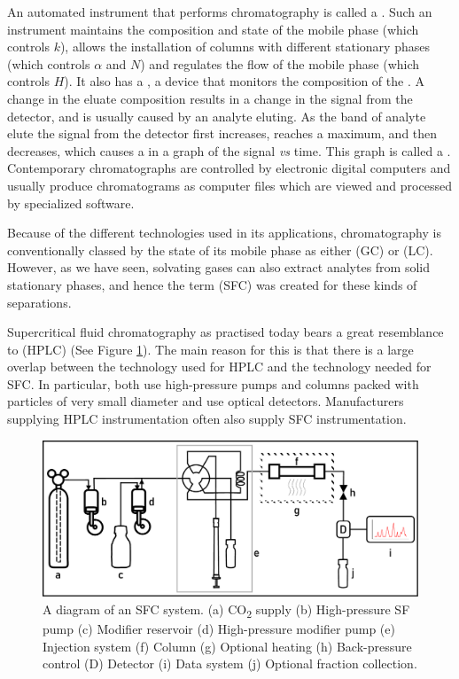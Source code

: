 An automated instrument that performs chromatography is called a
. Such an instrument maintains the composition and state
of the mobile phase (which controls \(k\)), allows the installation of columns
with different stationary phases (which controls \(\alpha\) and \(N\)) and
regulates the flow of the mobile phase (which controls \(H\)). It also has a
, a device that monitors the composition of the
. A change in the eluate composition results in a change in the
signal from the detector, and is usually caused by an analyte eluting. As the
band of analyte elute the signal from the detector first increases, reaches a
maximum, and then decreases, which causes a  in a graph of the
signal \textit{vs} time. This graph is called a .
Contemporary chromatographs are controlled by electronic digital computers and
usually produce chromatograms as computer files which are viewed and processed
by specialized software.

Because of the different technologies used in its applications, chromatography
is conventionally classed by the state of its mobile phase as either
 (GC) or  (LC).
However, as we have seen, solvating gases can also extract analytes from solid
stationary phases, and hence the term  (SFC) was created for these kinds of separations.

Supercritical fluid chromatography as practised today bears a great resemblance
to  (HPLC) (See Figure
\ref{fig:sfcdiagram}). The main reason for this is that there is a large overlap
between the technology used for HPLC and the technology needed for SFC. In
particular, both use high-pressure pumps and columns packed with particles of
very small diameter and use optical detectors. Manufacturers supplying HPLC
instrumentation often also supply SFC instrumentation.

\begin{figure}[hptb]
\centering
\includegraphics[width=\textwidth]{Figures/SFC_System}
\decoRule
\caption[SFC system diagram]{A diagram of an SFC system. (a) CO\textsubscript{2}
supply (b) High-pressure SF pump (c) Modifier reservoir (d) High-pressure
modifier pump (e) Injection system (f) Column (g) Optional heating (h)
Back-pressure control (D) Detector (i) Data system (j) Optional fraction
collection.}
\label{fig:sfcdiagram}

\end{figure}

